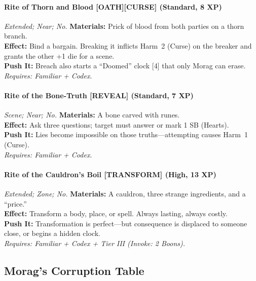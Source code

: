 \paragraph{Rite of Thorn and Blood \textnormal{[OATH][CURSE]} (Standard, 8 XP)}  
\emph{Extended; Near; No.}  
\textbf{Materials:} Prick of blood from both parties on a thorn branch. \\  
\textbf{Effect:} Bind a bargain. Breaking it inflicts Harm~2 (Curse) on the breaker and grants the other +1 die for a scene. \\  
\textbf{Push It:} Breach also starts a “Doomed” clock [4] that only Morag can erase. \\  
\emph{Requires: Familiar + Codex.}

\paragraph{Rite of the Bone-Truth \textnormal{[REVEAL]} (Standard, 7 XP)}  
\emph{Scene; Near; No.}  
\textbf{Materials:} A bone carved with runes. \\  
\textbf{Effect:} Ask three questions; target must answer or mark 1 SB (Hearts). \\  
\textbf{Push It:} Lies become impossible on those truths—attempting causes Harm~1 (Curse). \\  
\emph{Requires: Familiar + Codex.}

\paragraph{Rite of the Cauldron’s Boil \textnormal{[TRANSFORM]} (High, 13 XP)}  
\emph{Extended; Zone; No.}  
\textbf{Materials:} A cauldron, three strange ingredients, and a “price.” \\  
\textbf{Effect:} Transform a body, place, or spell. Always lasting, always costly. \\  
\textbf{Push It:} Transformation is perfect—but consequence is displaced to someone close, or begins a hidden clock. \\  
\emph{Requires: Familiar + Codex + Tier III (\textit{Invoke:} 2 Boons).}

\subsection*{Morag's Corruption Table}
\label{sec:morag-corruption}

